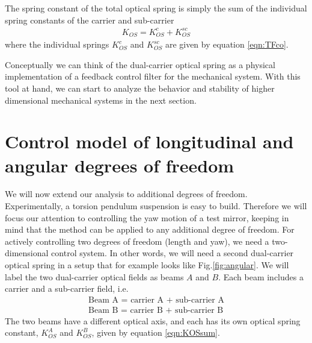 \documentclass[%
 reprint,
 amsmath,amssymb,
 aps,
]{revtex4-1}
\begin{document}
The spring constant of the total optical spring is simply the sum of the individual spring constants of the carrier and sub-carrier
\begin{eqnarray}
\label{eqn:KOSsum}
K_{OS}=K_{OS}^c+K_{OS}^{sc}
\end{eqnarray}
where the individual springs $K_{OS}^c$ and $K_{OS}^{sc}$ are given by equation \ref{eqn:TFco}.


Conceptually we can think of the dual-carrier optical spring as a physical implementation of a feedback control filter for the mechanical system. With this tool at hand, we can start to analyze the behavior and stability of higher dimensional mechanical systems in the next section.



\section{Control model of longitudinal and angular degrees of freedom}
\label{sec:III} 

We will now extend our analysis to additional degrees of freedom. Experimentally, a torsion pendulum suspension is  easy to build. Therefore we will focus our attention to controlling the yaw motion of a test mirror, keeping in mind that the method can be applied to any additional degree of freedom. For actively controlling two degrees of freedom (length and yaw), we need a two-dimensional control system. In other words, we will need a second dual-carrier optical spring in a setup that for example looks like Fig.\ref{fig:angular}. We will label the two dual-carrier optical fields as beams $A$ and $B$. Each beam includes a carrier and a sub-carrier field, i.e.
\begin{eqnarray}
\label{eqn:beams}
\mbox{Beam A = carrier A + sub-carrier A}\\ \nonumber
\mbox{Beam B = carrier B + sub-carrier B}\nonumber
\end{eqnarray}
The two beams have a different optical axis, and each has its own optical spring constant, $K_{OS}^A$ and $K_{OS}^B$, given by equation 
\ref{eqn:KOSsum}.
\end{document}
